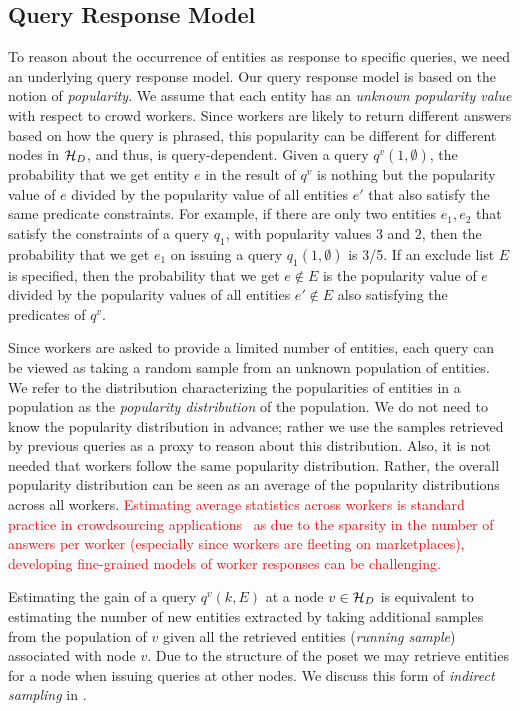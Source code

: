 \subsection{Query Response Model}
\label{sec:sampling}
To reason about the occurrence of entities as response to specific queries, we need an underlying query response model. Our query response model is based on the notion of {\em popularity}. We assume that each entity has an {\em unknown popularity value} with respect to crowd workers. Since workers are likely to return different answers based on how the query is phrased, this popularity can be different for different nodes in $\mathcal{H}_D$, and thus, is query-dependent. 
Given a query $q^v(1, \emptyset)$, the probability that we get entity $e$ in the result of $q^v$ is nothing but the popularity value of $e$ divided by the popularity value of all entities $e'$ that also satisfy the same predicate constraints. For example, if there are only two entities $e_1, e_2$ that satisfy the constraints of a query $q_1$, with popularity values $3$ and $2$, then the probability that we get $e_1$ on issuing a query $q_1(1, \emptyset)$ is 3/5. If an exclude list $E$ is specified, then the probability that we get $e \notin E$ is the popularity value of $e$ divided by the popularity values of all entities $e' \notin E$ also satisfying the predicates of $q^v$. 

Since workers are asked to provide a limited number of entities, each query can be viewed as taking a random sample from an unknown population of entities. We refer to the distribution characterizing the popularities of entities in a population as the {\em popularity distribution} of the population. We do not need to know the popularity distribution in advance; rather we use the samples retrieved by previous queries as a proxy to reason about this distribution. Also, it is not needed that workers follow the same popularity distribution. Rather, the overall popularity distribution can be seen as an average of the popularity distributions across all workers. \textcolor{red}{Estimating average statistics across workers is standard practice in crowdsourcing applications~\cite{DasSarma:2016:TGO:2882903.2882953,trushkowsky:2013} as due to the sparsity in the number of answers per worker (especially since workers are fleeting on marketplaces), developing fine-grained models of worker responses can be challenging.}

Estimating the gain of a query $q^v(k,E)$ at a node $v \in \mathcal{H}_D$ is equivalent to estimating the number of new entities extracted by taking additional samples from the population of $v$ given all the retrieved entities ({\em running sample}) associated with node $v$. Due to the structure of the poset we may retrieve entities for a node when issuing queries at other nodes. We discuss this form of {\em indirect sampling} in . 

